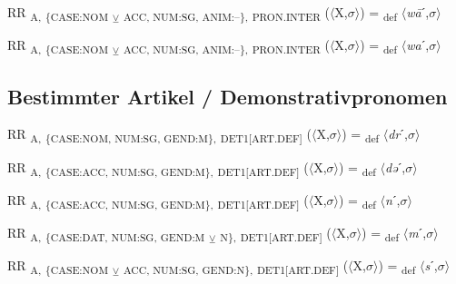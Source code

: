 {\begin{exe}
 RR \textsubscript{A,} \textsubscript{\{CASE:NOM} \textsubscript{${\veebar}$}\textsubscript{ ACC, NUM:SG, ANIM:–\},} \textsubscript{PRON.INTER} ($\langle$X,$\sigma $$\rangle$) = \textsubscript{def} $\langle$\textit{w\=a}ˊ,$\sigma $$\rangle$
\end{exe}

\begin{exe}
 RR \textsubscript{A,} \textsubscript{\{CASE:NOM} \textsubscript{${\veebar}$}\textsubscript{ ACC, NUM:SG, ANIM:–\},} \textsubscript{PRON.INTER} ($\langle$X,$\sigma $$\rangle$) = \textsubscript{def} $\langle$\textit{wa}ˊ,$\sigma $$\rangle$
\end{exe}

\subsection{Bestimmter Artikel / Demonstrativpronomen}

\begin{exe}
 RR \textsubscript{A,} \textsubscript{\{CASE:NOM, NUM:SG, GEND:M\},} \textsubscript{DET1[ART.DEF]} ($\langle$X,$\sigma $$\rangle$) = \textsubscript{def} $\langle$\textit{dr}ˊ,$\sigma $$\rangle$
\end{exe}

\begin{exe}
 RR \textsubscript{A,} \textsubscript{\{CASE:ACC, NUM:SG, GEND:M\},} \textsubscript{DET1[ART.DEF]} ($\langle$X,$\sigma $$\rangle$) = \textsubscript{def} $\langle$\textit{də}ˊ,$\sigma $$\rangle$
\end{exe}

\begin{exe}
 RR \textsubscript{A,} \textsubscript{\{CASE:ACC, NUM:SG, GEND:M\},} \textsubscript{DET1[ART.DEF]} ($\langle$X,$\sigma $$\rangle$) = \textsubscript{def} $\langle$\textit{n}ˊ,$\sigma $$\rangle$
\end{exe}

\begin{exe}
 RR \textsubscript{A,} \textsubscript{\{CASE:DAT, NUM:SG, GEND:M} \textsubscript{${\veebar}$}\textsubscript{ N\},} \textsubscript{DET1[ART.DEF]} ($\langle$X,$\sigma $$\rangle$) = \textsubscript{def} $\langle$\textit{m}ˊ,$\sigma $$\rangle$
\end{exe}

\begin{exe}
 RR \textsubscript{A,} \textsubscript{\{CASE:NOM} \textsubscript{${\veebar}$}\textsubscript{ ACC, NUM:SG, GEND:N\},} \textsubscript{DET1[ART.DEF]} ($\langle$X,$\sigma $$\rangle$) = \textsubscript{def} $\langle$\textit{s}ˊ,$\sigma $$\rangle$
\end{exe}

}
